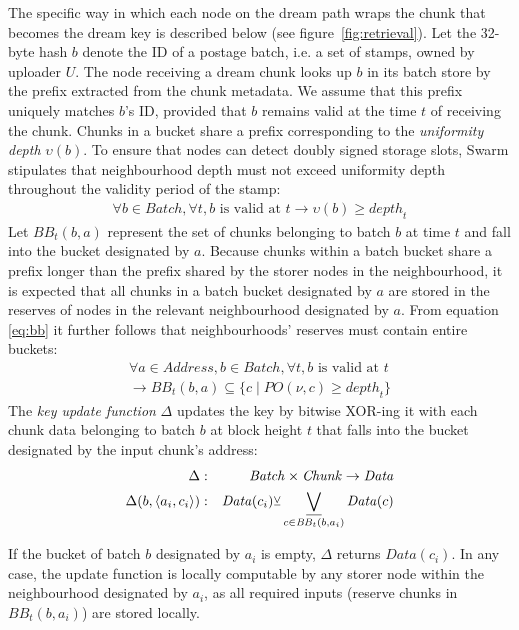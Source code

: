 \documentclass[singlecolumn]{acmart}
\newcommand\xor{\text{\small$\veebar$}}
\DeclareMathOperator*{\XOR}{\underline{\bigvee}}
\newcommand{\node}{\nu}
\begin{document}
The specific way in which each node on the dream path wraps the chunk that becomes the dream key is described below (see figure~\ref{fig:retrieval}). Let the 32-byte hash $b$ denote the ID of a postage batch, i.e. a set of stamps, owned by uploader $U$. The node receiving a dream chunk looks up $b$ in its batch store by the prefix extracted from the chunk metadata. We assume that this prefix uniquely matches $b$'s ID, provided that $b$ remains valid at the time $t$ of receiving the chunk. Chunks in a bucket share a prefix corresponding to the \emph{uniformity depth} $\upsilon(b)$. To ensure that nodes can detect doubly signed storage slots, Swarm stipulates that neighbourhood depth must not exceed uniformity depth throughout the validity period of the stamp:
%
\begin{eqnarray}\label{eq:bb}
\forall b\in\mathit{Batch}, \forall t,  b \text{ is valid at }t\rightarrow\upsilon(b)\ge \mathit{depth}_t
\end{eqnarray}
%
Let $\mathit{BB}_t(b,a)$ represent the set of chunks belonging to batch $b$ at time $t$ and fall into the bucket  designated by $a$.
Because chunks within a batch bucket share a prefix longer than the prefix shared by the storer nodes in the neighbourhood, it is expected that all chunks in a batch bucket designated by $a$ are stored in the reserves of nodes in the relevant neighbourhood designated by $a$.
From equation \ref{eq:bb} it further follows that neighbourhoods' reserves must contain entire buckets:
%
\begin{eqnarray}
\forall a\in\mathit{Address}, b\in\mathit{Batch},  \forall t,  b \text{ is valid at }t\\
\rightarrow\mathit{BB}_t(b,a)\subseteq\{c\mid\mathit{PO}(\node,c)\ge\mathit{depth}_t\}
\end{eqnarray}
%
The \emph{key update function} $\Delta$ updates the key by bitwise XOR-ing it with each chunk data belonging to batch $b$ at block height $t$ that falls into the bucket designated by the input chunk's address:
\begin{eqnarray}
{\Delta}&:&
\mathit{Batch}\times\mathit{Chunk}\to\mathit{Data}\\
{\Delta}(b,\langle a_i,c_i\rangle)&:&\mathit{Data}(c_i)\xor\XOR_{c\in\mathit{BB}_t(b,a_i)}\mathit{Data}(c)
\end{eqnarray}

If the bucket of batch $b$ designated by $a_i$ is empty, $\Delta$ returns $\mathit{Data}(c_i)$.
In any case, the update function is locally computable by any storer node within the neighbourhood designated by $a_i$, as all required inputs (reserve chunks in $\mathit{BB}_t(b,a_i)$) are stored locally.
\end{document}
